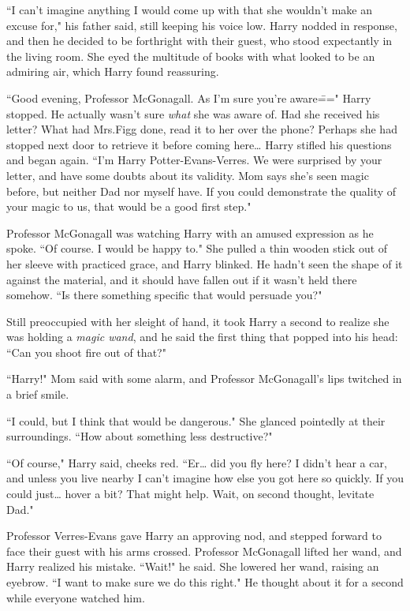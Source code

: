 ``I can't imagine anything I would come up with that she wouldn't make an excuse for," his father said, still keeping his voice low. Harry nodded in response, and then he decided to be forthright with their guest, who stood expectantly in the living room. She eyed the multitude of books with what looked to be an admiring air, which Harry found reassuring.

``Good evening, Professor McGonagall. As I'm sure you're aware\===" Harry stopped. He actually wasn't sure \emph{what} she was aware of. Had she received his letter? What had Mrs.\?Figg done, read it to her over the phone? Perhaps she had stopped next door to retrieve it before coming here{\ldots} Harry stifled his questions and began again. ``I'm Harry Potter-Evans-Verres. We were surprised by your letter, and have some doubts about its validity. Mom says she's seen magic before, but neither Dad nor myself have. If you could demonstrate the quality of your magic to us, that would be a good first step."

Professor McGonagall was watching Harry with an amused expression as he spoke. ``Of course. I would be happy to." She pulled a thin wooden stick out of her sleeve with practiced grace, and Harry blinked. He hadn't seen the shape of it against the material, and it should have fallen out if it wasn't held there somehow. ``Is there something specific that would persuade you?"

Still preoccupied with her sleight of hand, it took Harry a second to realize she was holding a \emph{magic wand}, and he said the first thing that popped into his head: ``Can you shoot fire out of that?"

``Harry!" Mom said with some alarm, and Professor McGonagall's lips twitched in a brief smile.

``I could, but I think that would be dangerous." She glanced pointedly at their surroundings. ``How about something less destructive?"

``Of course," Harry said, cheeks red. ``Er{\ldots} did you fly here? I didn't hear a car, and unless you live nearby I can't imagine how else you got here so quickly. If you could just{\ldots} hover a bit? That might help. Wait, on second thought, levitate Dad."

Professor Verres-Evans gave Harry an approving nod, and stepped forward to face their guest with his arms crossed. Professor McGonagall lifted her wand, and Harry realized his mistake. ``Wait!" he said. She lowered her wand, raising an eyebrow. ``I want to make sure we do this right." He thought about it for a second while everyone watched him.


